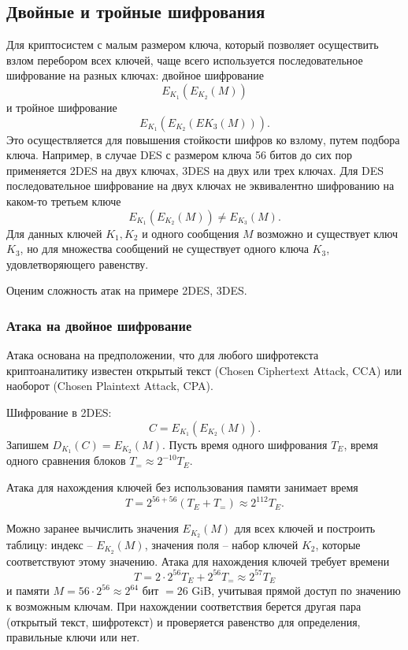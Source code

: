 \subsection{Двойные и тройные шифрования}

Для криптосистем с малым размером ключа, который позволяет осуществить взлом перебором всех ключей, чаще всего используется последовательное шифрование на разных ключах: двойное шифрование
    \[ E_{K_1}( E_{K_2}( M)) \]
и тройное шифрование
    \[ E_{K_1}( E_{K_2}( E{K_3} (M))). \]
Это осуществляется для повышения стойкости шифров ко взлому, путем подбора ключа.
Например, в случае DES с размером ключа 56 битов до сих пор применяется 2DES на двух ключах, 3DES на двух или трех ключах. Для DES последовательное шифрование на двух ключах не эквивалентно шифрованию на каком-то третьем ключе
    \[ E_{K_1}( E_{K_2} (M)) \neq E_{K_3}(M). \]
Для данных ключей $K_1, K_2$ и одного сообщения $M$ возможно и существует ключ $K_3$, но для множества сообщений не существует одного ключа $K_3$, удовлетворяющего равенству.

Оценим сложность атак на примере 2DES, 3DES.


\subsubsection{Атака на двойное шифрование}


Атака основана на предположении, что для любого шифротекста криптоаналитику известен открытый текст (Chosen Ciphertext Attack, CCA) или наоборот (Chosen Plaintext Attack, CPA).

Шифрование в 2DES:
    \[ C = E_{K_1}( E_{K_2}(M)). \]
Запишем $D_{K_1}(C) = E_{K_2}(M)$. Пусть время одного шифрования $T_E$, время одного сравнения блоков $T_{=} \approx 2^{-10} T_E$.

Атака для нахождения ключей без использования памяти занимает время
    \[ T = 2^{56 + 56} (T_E + T_{=}) \approx 2^{112} T_E. \]

Можно заранее вычислить значения $E_{K_2}(M)$ для всех ключей и построить таблицу: индекс -- $E_{K_2}(M)$, значения поля -- набор ключей $K_2$, которые соответствуют этому значению. Атака для нахождения ключей требует времени
    \[ T = 2 \cdot 2^{56} T_E + 2^{56} T_{=} \approx 2^{57} T_E \]
и памяти $M = 56 \cdot 2^{56} \approx 2^{64}$ бит $= 26$ GiB, учитывая прямой доступ по значению к возможным ключам. При нахождении соответствия берется другая пара (открытый текст, шифротекст) и проверяется равенство для определения, правильные ключи или нет.

